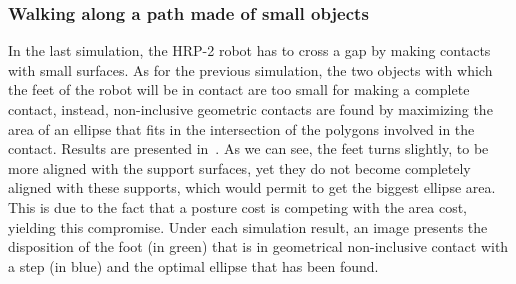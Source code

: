 


\subsubsection{Walking along a path made of small objects}
\label{subsubsec:riviere}


In the last simulation, the HRP-2 robot has to cross a gap by making contacts
with small surfaces.
As for the previous simulation, the two objects
with which the feet of the robot will be in contact are too small for making a
complete contact, instead, non-inclusive geometric contacts are found by
maximizing the area of an ellipse that fits in the intersection of the polygons
involved in the contact.
Results are presented in~.
As we can see, the feet turns slightly, to be more aligned with the support
surfaces, yet they do not become completely aligned with these supports, which would permit to get the biggest ellipse area.
This is due to the fact that a posture cost is competing with the area cost, yielding this compromise.
Under each simulation result, an image presents the disposition of the foot (in green) that is in geometrical non-inclusive contact with a step (in blue) and the optimal ellipse that has been found.

